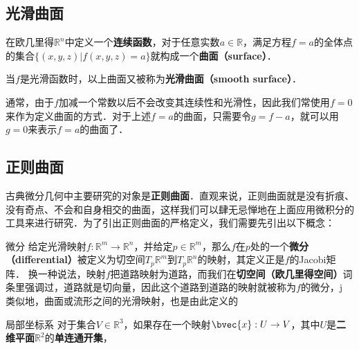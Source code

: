 
\subsection{光滑曲面}

在欧几里得$\mathbb{R}^n$中定义一个\textbf{连续函数}，对于任意实数$a\in\mathbb{R}$，满足方程$f=a$的全体点的集合$\{(x, y, z)|f(x, y, z)=a\}$就构成一个\textbf{曲面（surface）}．

当$f$是光滑函数时，以上曲面又被称为\textbf{光滑曲面（smooth surface）}．

通常，由于$f$加减一个常数以后不会改变其连续性和光滑性，因此我们常使用$f=0$来作为定义曲面的方式．对于上述$f=a$的曲面，只需要令$g=f-a$，就可以用$g=0$来表示$f=a$的曲面了．

\subsection{正则曲面}

古典微分几何中主要研究的对象是\textbf{正则曲面}．直观来说，正则曲面就是没有折痕、没有奇点、不会和自身相交的曲面，这样我们可以肆无忌惮地在上面应用微积分的工具来进行研究．为了引出正则曲面的严格定义，我们需要先引出以下概念：

\begin{definition}{微分}
给定光滑映射$f:\mathbb{R}^m\to\mathbb{R}^n$，并给定$p\in\mathbb{R}^m$，那么$f$在$p$处的一个\textbf{微分（differential）}被定义为切空间$T_p\mathbb{R}^m$到$T_p\mathbb{R}^n$的映射，其定义正是$f$的Jacobi矩阵．
换一种说法，映射$f$把道路映射为道路，而我们在\textbf{切空间（欧几里得空间）}词条里强调过，道路就是切向量，因此这个道路到道路的映射就被称为$f$的微分，j
类似地，曲面或流形之间的光滑映射，也是由此定义的
\end{definition}

\begin{definition}{局部坐标系}
对于集合$V\in \mathbb{R}^3$，如果存在一个映射$\bvec{x}:U\to V$，其中$U$是\textbf{二维平面}$\mathbb{R}^2$的\textbf{单连通开集}，
\end{definition}
